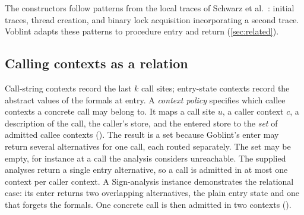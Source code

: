 The constructors follow patterns from the local traces of Schwarz et
al.~\cite{schwarz21}: initial traces, thread creation, and binary lock
acquisition incorporating a second trace. Voblint adapts these patterns to
procedure entry and return (\cref{sec:related}).

\subsection{Calling contexts as a relation}

Call-string contexts record the last $k$ call sites; entry-state contexts
record the abstract values of the formals at entry. A \emph{context policy}
specifies which callee contexts a concrete call may belong to. It maps a call
site $u$, a caller context $c$, a description of the call, the caller's store,
and the entered store to the
\emph{set} of admitted callee contexts (). The result
is a set because Goblint's enter may return several
alternatives for one call, each routed separately. The set may be empty, for instance at a
call the analysis considers unreachable. The supplied analyses return a single
entry alternative, so a call is admitted in at most one context per caller
context. A Sign-analysis instance demonstrates the relational case: its enter
returns two overlapping alternatives, the plain entry state and one that
forgets the formals. One concrete call is then admitted in two contexts
().

